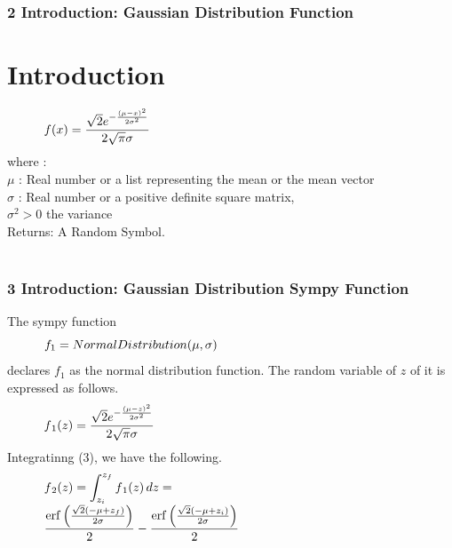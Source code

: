 \documentclass[11pt]{beamer}
\begin{document}
\begin{frame}
\frametitle{2 Introduction: Gaussian Distribution Function}
\noindent \section{Introduction}
\begin{equation}
\begin{minipage}{300pt}
 $\displaystyle f(x) = \frac{\sqrt{2} e^{- \frac{\left(\mu - x\right)^{2}}{2 \sigma^{2}}}}{2 \sqrt{\pi} \sigma}$  
\end{minipage}
\end{equation}
\noindent where :	\\ $\mu$    : Real number or a list representing the mean or the mean vector \\ $\sigma$ : Real number or a positive definite square matrix, \\ $\sigma^{2} > 0 $ the variance \\ Returns: A Random Symbol. \\ \ \\ 

\end{frame}

\begin{frame}
\frametitle{3 Introduction: Gaussian Distribution Sympy Function}
\noindent The sympy function 
\begin{equation}
\begin{minipage}{300pt}
 $\displaystyle f_{1} = NormalDistribution(\mu, \sigma)$  
\end{minipage}
\end{equation}
\noindent declares $f_{1} $ as the normal distribution function. The random     variable of $z $ of it is expressed as follows.
\begin{equation}
\begin{minipage}{300pt}
 $\displaystyle f{_1}(z) = \frac{\sqrt{2} e^{- \frac{\left(\mu - z\right)^{2}}{2 \sigma^{2}}}}{2 \sqrt{\pi} \sigma}$  
\end{minipage}
\end{equation}
\noindent Integratinng (3), we have the following.
\begin{equation}
\begin{minipage}{300pt}
 $\displaystyle f{_2}(z) = \int_{z_{i}}^{z_{f}} f{_1}(z)\, dz = \\ \frac{\operatorname{erf}{\left (\frac{\sqrt{2} \left(- \mu + z_{f}\right)}{2 \sigma} \right )}}{2} - \frac{\operatorname{erf}{\left (\frac{\sqrt{2} \left(- \mu + z_{i}\right)}{2 \sigma} \right )}}{2}$  
\end{minipage}
\end{equation}

\end{frame}
\end{document}
